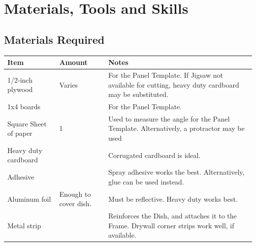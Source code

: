 \documentclass[titlepage]{article}
\begin{document}
    
    \section{Materials, Tools and Skills}
        \subsection{Materials Required}
            \begin{table}[h]
                \begin{tabular}{|p{3cm}|p{3cm}|p{11cm}|}
                \hline
                \rowcolor[HTML]{C0C0C0} 
                Item                                                        & Amount                & Notes                                                                                                                \\ \hline
                1/2-inch plywood                                            & Varies                & For the Panel Template.  If Jigsaw not available for cutting, heavy duty cardboard may be substituted.               \\ \hline
                1x4 boards                                                  &                       & For the Panel Template.                                                                                              \\ \hline
                Square Sheet of paper                                       & 1                     & Used to measure the angle for the Panel Template.  Alternatively, a protractor may be used                           \\ \hline
                Heavy duty cardboard                                        &                       & Corrugated cardboard is ideal.                                                                                       \\ \hline
                Adhesive                                                    &                       & Spray adhesive works the best.  Alternatively, glue can be used instead.                                             \\ \hline
                Aluminum foil                                               & Enough to cover dish. & Must be reflective.  Heavy duty works best.                                                                          \\ \hline
                Metal strip                                                 &                       & Reinforces the Dish, and attaches it to the Frame.  Drywall corner strips work well, if available.                   \\ \hline

\end{tabular}
\end{table}
\end{document}
